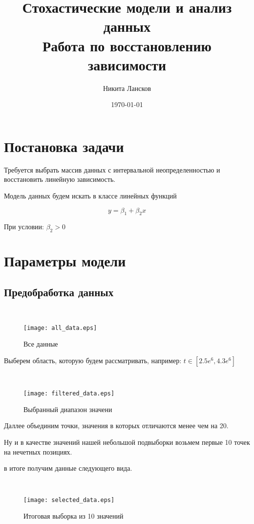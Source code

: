 \documentclass[a4paper,12pt]{article}
\date{\today}
\author{Никита Лансков}
\title{Стохастические модели и анализ данных\\
Работа по восстановлению зависимости}
\begin{document}

\maketitle
\tableofcontents

\newpage

\section{Постановка задачи}
Требуется выбрать массив данных с интервальной неопределенностью и восстановить
линейную зависимость.

Модель данных будем искать в классе линейных функций

\begin{equation}
    y = \beta_1 + \beta_2x
\end{equation}

При условии: $\beta_2 > 0$


\section{Параметры модели}

\subsection{Предобработка данных}
\begin{figure}[h!]~\label{fig1}
\centerline{\texttt{[image: all\_data.eps]}}
\caption{Все данные}
\end{figure}
Выберем область, которую будем рассматривать, например: 
$t \in [2.5e^6, 4.3e^6]$

\begin{figure}[h!]~\label{fig2}
\centerline{\texttt{[image: filtered\_data.eps]}}
\caption{Выбранный диапазон значени}
\end{figure}
Даллее объединим точки, значения в которых отличаются менее чем на 20.

Ну и в качестве значений нашей небольшой подвыборки возьмем первые 10 точек
на нечетных позициях.

в итоге получим данные следующего вида.

\newpage
\begin{figure}[h!]~\label{fig3}
\centerline{\texttt{[image: selected\_data.eps]}}
\caption{Итоговая выборка из 10 значений}
\end{figure}
\end{document}
